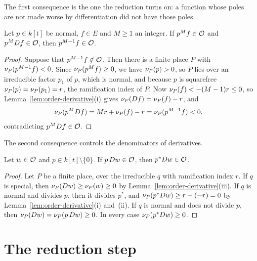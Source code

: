 The first consequence is the one the reduction turns on: a function whose
poles are not made worse by differentiation did not have those poles.

\begin{lemma}\label{lem:lower-pole}
Let $p \in k[t]$ be normal, $f \in E$ and $M \ge 1$ an integer. If $p^M f \in
\mathcal{O}$ and $p^M Df \in \mathcal{O}$, then $p^{M-1} f \in \mathcal{O}$.
\end{lemma}

\begin{proof}
Suppose that $p^{M-1} f \notin \mathcal{O}$. Then there is a finite place $P$ with
$\nu_{P}(p^{M-1} f) < 0$. Since $\nu_{P}(p^M f) \ge 0$, we have $\nu_{P}(p) >
0$, so $P$ lies over an irreducible factor $p_1$ of $p$, which is normal, and
because $p$ is squarefree $\nu_{P}(p) = \nu_{P}(p_1) = r$, the ramification
index of $P$. Now $\nu_{P}(f) < -(M-1) r \le 0$, so
Lemma~\ref{lem:order-derivative}(i) gives $\nu_{P}(Df) = \nu_{P}(f) - r$, and
\[
  \nu_{P}(p^M Df) = M r + \nu_{P}(f) - r = \nu_{P}(p^{M-1} f) < 0,
\]
contradicting $p^M Df \in \mathcal{O}$.
\end{proof}

The second consequence controls the denominators of derivatives.

\begin{lemma}\label{lem:normal-part}
Let $w \in \mathcal{O}$ and $p \in k[t] \setminus \{0\}$. If $p\, Dw \in \mathcal{O}$, then
$p^* Dw \in \mathcal{O}$.
\end{lemma}

\begin{proof}
Let $P$ be a finite place, over the irreducible $q$ with ramification index
$r$. If $q$ is special, then $\nu_{P}(Dw) \ge \nu_{P}(w) \ge 0$ by
Lemma~\ref{lem:order-derivative}(iii). If $q$ is normal and divides $p$, then
it divides $p^*$, and $\nu_{P}(p^* Dw) \ge r + (-r) = 0$ by
Lemma~\ref{lem:order-derivative}(i) and~(ii). If $q$ is normal and does not
divide $p$, then $\nu_{P}(Dw) = \nu_{P}(p\, Dw) \ge 0$. In every case
$\nu_{P}(p^* Dw) \ge 0$.
\end{proof}

\section{The reduction step}\label{sec:hermite-step}

